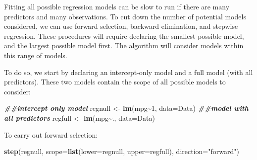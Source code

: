 \documentclass[
]{book}
\newenvironment{Shaded}{\begin{snugshade}}{\end{snugshade}}
\newcommand{\AttributeTok}[1]{\textcolor[rgb]{0.13,0.29,0.53}{#1}}
\newcommand{\DecValTok}[1]{\textcolor[rgb]{0.00,0.00,0.81}{#1}}
\newcommand{\DocumentationTok}[1]{\textcolor[rgb]{0.56,0.35,0.01}{\textbf{\textit{#1}}}}
\newcommand{\FunctionTok}[1]{\textcolor[rgb]{0.13,0.29,0.53}{\textbf{#1}}}
\newcommand{\NormalTok}[1]{#1}
\newcommand{\OtherTok}[1]{\textcolor[rgb]{0.56,0.35,0.01}{#1}}
\newcommand{\SpecialCharTok}[1]{\textcolor[rgb]{0.81,0.36,0.00}{\textbf{#1}}}
\newcommand{\StringTok}[1]{\textcolor[rgb]{0.31,0.60,0.02}{#1}}
\begin{document}
Fitting all possible regression models can be slow to run if there are many predictors and many observations. To cut down the number of potential models considered, we can use forward selection, backward elimination, and stepwise regression. These procedures will require declaring the smallest possible model, and the largest possible model first. The algorithm will consider models within this range of models.

To do so, we start by declaring an intercept-only model and a full model (with all predictors). These two models contain the scope of all possible models to consider:

\begin{Shaded}
\begin{Highlighting}[]
\DocumentationTok{\#\#intercept only model}
\NormalTok{regnull }\OtherTok{\textless{}{-}} \FunctionTok{lm}\NormalTok{(mpg}\SpecialCharTok{\textasciitilde{}}\DecValTok{1}\NormalTok{, }\AttributeTok{data=}\NormalTok{Data)}
\DocumentationTok{\#\#model with all predictors}
\NormalTok{regfull }\OtherTok{\textless{}{-}} \FunctionTok{lm}\NormalTok{(mpg}\SpecialCharTok{\textasciitilde{}}\NormalTok{., }\AttributeTok{data=}\NormalTok{Data)}
\end{Highlighting}
\end{Shaded}

To carry out forward selection:

\begin{Shaded}
\begin{Highlighting}[]
\FunctionTok{step}\NormalTok{(regnull, }\AttributeTok{scope=}\FunctionTok{list}\NormalTok{(}\AttributeTok{lower=}\NormalTok{regnull, }\AttributeTok{upper=}\NormalTok{regfull), }\AttributeTok{direction=}\StringTok{"forward"}\NormalTok{)}
\end{Highlighting}
\end{Shaded}
\end{document}
